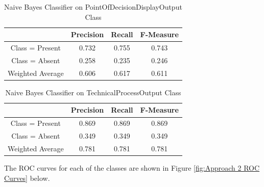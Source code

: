 \documentclass[11pt, notitlepage,abstracton,oneside]{article}   	%
\begin{document}
\begin{table}[H]
    \caption{Naive Bayes Classifier on PointOfDecisionDisplayOutput Class}
        \begin{center}
        \begin{tabular}{|c|c|c|c|}
            \hline
            & Precision & Recall & F-Measure \\ \hline
            Class = Present & 0.732 & 0.755 & 0.743 \\ \hline
            Class = Absent & 0.258 & 0.235 & 0.246 \\ \hline
            Weighted Average & 0.606 & 0.617 & 0.611 \\ \hline
        \end{tabular}
        \end{center}
    \label{default}
\end{table}%

\begin{table}[H]
    \caption{Naive Bayes Classifier on TechnicalProcessOutput Class}
        \begin{center}
        \begin{tabular}{|c|c|c|c|}
            \hline
            & Precision & Recall & F-Measure \\ \hline
            Class = Present & 0.869 & 0.869 & 0.869 \\ \hline
            Class = Absent & 0.349 & 0.349 & 0.349 \\ \hline
            Weighted Average & 0.781 & 0.781 & 0.781 \\ \hline
        \end{tabular}
        \end{center}
    \label{default}
\end{table}%

The ROC curves for each of the classes are shown in Figure \ref{fig:Approach 2 ROC Curves} below.
\end{document}

